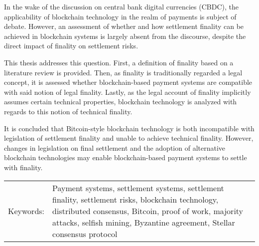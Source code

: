 In the wake of the discussion on central bank digital currencies (CBDC), the applicability of blockchain technology in the realm of payments is subject of debate.
However, an assessment of whether and how settlement finality can be achieved in blockchain systems is largely absent from the discourse, despite the direct impact of finality on settlement risks.

This thesis addresses this question.
First, a definition of finality based on a literature review is provided.
Then, as finality is traditionally regarded a legal concept, it is assessed whether blockchain-based payment systems are compatible with said notion of legal finality.
Lastly, as the legal account of finality implicitly assumes certain technical properties, blockchain technology is analyzed with regards to this notion of technical finality.

It is concluded that Bitcoin-style blockchain technology is both incompatible with legislation of settlement finality and unable to achieve technical finality.
However, changes in legislation on final settlement and the adoption of alternative blockchain technologies may enable blockchain-based payment systems to settle with finality.




\vspace{1cm}

\begin{tabularx}{\textwidth}{@{}l X}
  Keywords: & Payment systems, settlement systems, settlement finality, settlement risks, blockchain technology, distributed consensus, Bitcoin, proof of work, majority attacks, selfish mining, Byzantine agreement, Stellar consensus protocol
\end{tabularx}
